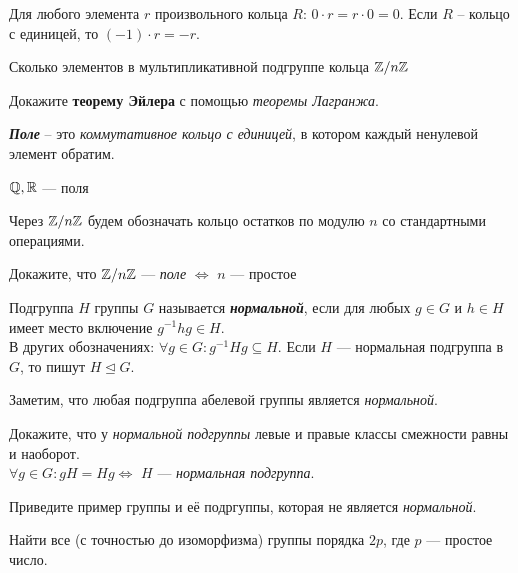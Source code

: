 \documentclass{article}
\begin{document}
    \begin{task_boxed}
        Для любого элемента $r$ произвольного кольца $R$: $0 \cdot r = r \cdot 0 = 0$.
        Если $R$ – кольцо с единицей, то $(-1) \cdot r = -r$.
    \end{task_boxed}

    \begin{task_boxed}
        Сколько элементов в мультипликативной подгруппе кольца $\mathbb{Z}/n\mathbb{Z}$
    \end{task_boxed}


    \begin{task_boxed}
        Докажите \textbf{теорему Эйлера} с помощью \textit{теоремы Лагранжа}.
    \end{task_boxed}


    \begin{definition_boxed}
        \textbf{\textit{Поле}} – это\textit{ коммутативное кольцо с единицей}, в котором каждый ненулевой элемент обратим.
    \end{definition_boxed}

    \begin{example}
        $ \mathbb{Q}, \mathbb{R} $ --- поля
    \end{example}


    \begin{example}
        Через $\mathbb{Z}/n\mathbb{Z}$ будем обозначать кольцо остатков по модулю $n$ со стандартными операциями.
    \end{example}

    \begin{task_boxed}
        Докажите, что $\mathbb{Z}/n\mathbb{Z}$ --- \textit{поле} $\Longleftrightarrow$ $n$ --- простое
    \end{task_boxed}

    \begin{definition_boxed}
        Подгруппа $H$ группы $G$ называется \textbf{\textit{нормальной}}, если для любых $g \in G$ и $h \in H$ имеет место включение $g^{-1}h g \in H$.\\
        В других обозначениях: $\forall g \in G : g^{-1}Hg \subseteq H$.
        Если $H$ — нормальная подгруппа в $G$, то пишут $H \trianglelefteq G$.
    \end{definition_boxed}

    \begin{example}
        Заметим, что любая подгруппа абелевой группы является \textit{нормальной}.
    \end{example}

    \begin{task_boxed}
        Докажите, что у \textit{нормальной подгруппы} левые и правые классы смежности равны и наоборот.\\
        $\forall g \in G: gH = Hg \Longleftrightarrow$ $H$ --- \textit{нормальная подгруппа}.
    \end{task_boxed}

    \begin{task_boxed}
        Приведите пример группы и её подргуппы, которая не является \textit{нормальной}.
    \end{task_boxed}

    \begin{task_boxed}[ *]
        Найти все (с точностью до изоморфизма) группы порядка $2p$, где $p$ — простое число.
    \end{task_boxed}
\end{document}

